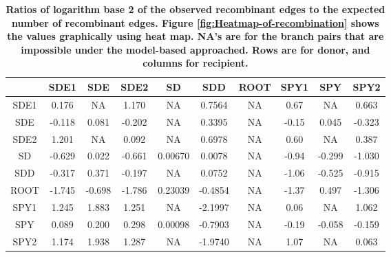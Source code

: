 \documentclass[10pt]{article}
\providecommand{\tabularnewline}{\\}
\begin{document}
\begin{table}[!ht]
\caption{
\bf{Ratios of logarithm base 2 of the observed
recombinant edges to the expected number of recombinant edges.}  Figure
\ref{fig:Heatmap-of-recombination} shows the values graphically using heat map.
NA's are for the branch pairs that are impossible under the model-based
approached. Rows are for donor, and columns for recipient.}
\noindent \centering{}\begin{tabular}{cccccccccc}
\hline
& SDE1 & SDE & SDE2 & SD & SDD & ROOT & SPY1 & SPY & SPY2 \tabularnewline
\hline
SDE1& 0.176  &   NA  &1.170  &    NA & 0.7564  & NA & 0.67 &    NA & 0.663\tabularnewline
SDE & -0.118 & 0.081 &-0.202 &     NA&  0.3395 &  NA& -0.15&  0.045& -0.323\tabularnewline
SDE2& 1.201  &   NA  &0.092  &    NA & 0.6978  & NA & 0.60 &    NA & 0.387\tabularnewline
SD  & -0.629 & 0.022 &-0.661 &0.00670&  0.0078 &  NA& -0.94& -0.299& -1.030\tabularnewline
SDD & -0.317 & 0.371 &-0.197 &     NA&  0.0752 &  NA& -1.06& -0.525& -0.915\tabularnewline
ROOT& -1.745 &-0.698 &-1.786 &0.23039& -0.4854 &  NA& -1.37&  0.497& -1.306\tabularnewline
SPY1& 1.245  &1.883  &1.251  &    NA &-2.1997  & NA & 0.06 &    NA & 1.062\tabularnewline
SPY & 0.089  &0.200  &0.298 &0.00098 &-0.7903  & NA &-0.19 &-0.058 &-0.159\tabularnewline
SPY2& 1.174  &1.938  &1.287  &    NA &-1.9740  & NA & 1.07 &    NA & 0.063\tabularnewline
\hline
\end{tabular}
\label{tab:heatmap}
\end{table}
\end{document}

